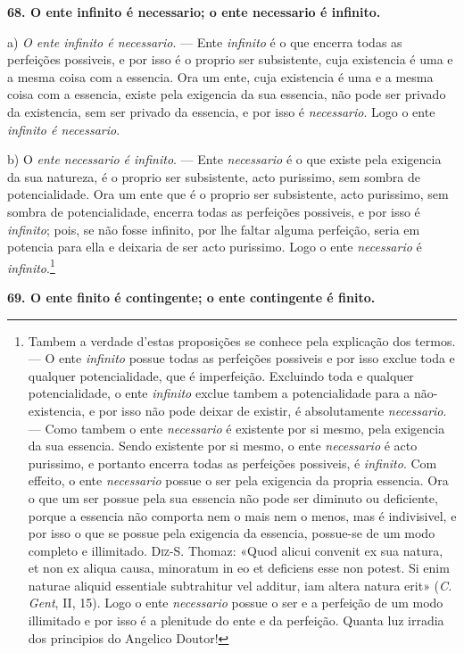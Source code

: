 \textbf{68. O ente infinito é necessario; o ente necessario é infinito.}

a) \emph{O ente infinito é necessario}. --- Ente \emph{infinito} é o que encerra todas as perfeições possiveis, e por isso é o proprio ser subsistente, cuja existencia é uma e a mesma coisa com a essencia. Ora um ente, cuja existencia é uma e a mesma coisa com a essencia, existe pela exigencia da sua essencia, não pode ser privado da existencia, sem ser privado da essencia, e por isso é \emph{necessario}. Logo o ente \emph{infinito é necessario}.

b) O \emph{ente necessario é infinito}. --- Ente \emph{necessario} é o que existe pela exigencia da sua natureza, é o proprio ser subsistente, acto purissimo, sem sombra de potencialidade. Ora um ente que é o proprio ser subsistente, acto purissimo, sem sombra de potencialidade, encerra todas as perfeições possiveis, e por isso é \emph{infinito}; pois, se não fosse infinito, por lhe faltar alguma perfeição, seria em potencia para ella e deixaria de ser acto purissimo. Logo o ente \emph{necessario} é \emph{infinito}.\footnote{Tambem a verdade d'estas proposições se conhece pela explicação dos termos. --- O ente \emph{infinito} possue todas as perfeições possiveis e por isso exclue toda e qualquer potencialidade, que é imperfeição. Excluindo toda e qualquer potencialidade, o ente \emph{infinito} exclue tambem a potencialidade para a não-existencia, e por isso não pode deixar de existir, é absolutamente \emph{necessario}. --- Como tambem o ente \emph{necessario} é existente por si mesmo, pela exigencia da sua essencia. Sendo existente por si mesmo, o ente \emph{necessario} é acto purissimo, e portanto encerra todas as perfeições possiveis, é \emph{infinito}. Com effeito, o ente \emph{necessario} possue o ser pela exigencia da propria essencia. Ora o que um ser possue pela sua essencia não pode ser diminuto ou deficiente, porque a essencia não comporta nem o mais nem o menos, mas é indivisivel, e por isso o que se possue pela exigencia da essencia, possue-se de um modo completo e illimitado. \textsc{Diz-S}. Thomaz: «Quod alicui convenit ex sua natura, et non ex aliqua causa, minoratum in eo et deficiens esse non potest. Si enim naturae aliquid essentiale subtrahitur vel additur, iam altera natura erit» (\emph{C. Gent}, II, 15). Logo o ente \emph{necessario} possue o ser e a perfeição de um modo illimitado e por isso é a plenitude do ente e da perfeição. Quanta luz irradia dos principios do Angelico Doutor!}

 \textbf{69. O ente finito é contingente; o ente contingente é finito.}

